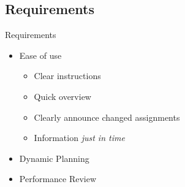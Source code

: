 \subsection{Requirements}
\begin{frame}{Requirements}{}
	\begin{itemize}
		\item Ease of use
		\begin{itemize}
			\item Clear instructions
			\item Quick overview
			\item Clearly announce changed assignments
			\item Information \textit{just in time}
		\end{itemize}
		\item Dynamic Planning
		\item Performance Review
	\end{itemize}
\end{frame}